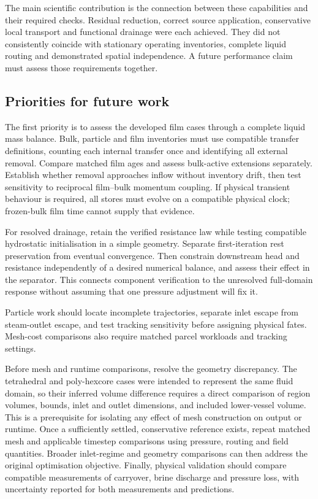 The main scientific contribution is the connection between these capabilities and their required checks. Residual reduction, correct source application, conservative local transport and functional drainage were each achieved. They did not consistently coincide with stationary operating inventories, complete liquid routing and demonstrated spatial independence. A future performance claim must assess those requirements together.

\subsection{Priorities for future work}

The first priority is to assess the developed film cases through a complete liquid mass balance. Bulk, particle and film inventories must use compatible transfer definitions, counting each internal transfer once and identifying all external removal. Compare matched film ages and assess bulk-active extensions separately. Establish whether removal approaches inflow without inventory drift, then test sensitivity to reciprocal film--bulk momentum coupling. If physical transient behaviour is required, all stores must evolve on a compatible physical clock; frozen-bulk film time cannot supply that evidence.

For resolved drainage, retain the verified resistance law while testing compatible hydrostatic initialisation in a simple geometry. Separate first-iteration rest preservation from eventual convergence. Then constrain downstream head and resistance independently of a desired numerical balance, and assess their effect in the separator. This connects component verification to the unresolved full-domain response without assuming that one pressure adjustment will fix it.

Particle work should locate incomplete trajectories, separate inlet escape from steam-outlet escape, and test tracking sensitivity before assigning physical fates. Mesh-cost comparisons also require matched parcel workloads and tracking settings.

Before mesh and runtime comparisons, resolve the geometry discrepancy. The tetrahedral and poly-hexcore cases were intended to represent the same fluid domain, so their inferred volume difference requires a direct comparison of region volumes, bounds, inlet and outlet dimensions, and included lower-vessel volume. This is a prerequisite for isolating any effect of mesh construction on output or runtime. Once a sufficiently settled, conservative reference exists, repeat matched mesh and applicable timestep comparisons using pressure, routing and field quantities. Broader inlet-regime and geometry comparisons can then address the original optimisation objective. Finally, physical validation should compare compatible measurements of carryover, brine discharge and pressure loss, with uncertainty reported for both measurements and predictions.

